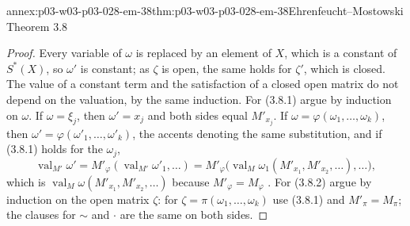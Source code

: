 \begin{annexitem}{annex:p03-w03-p03-028-em-38}{thm:p03-w03-p03-028-em-38}{Ehrenfeucht--Mostowski Theorem 3.8}
\begin{proof}
Every variable of \(\omega\) is replaced by an element of \(X\), which is a
constant of \(S^*(X)\), so \(\omega'\) is constant; as \(\zeta\) is open, the
same holds for \(\zeta'\), which is closed.  The value of a constant term and
the satisfaction of a closed open matrix do not depend on the valuation, by
the same induction.  For (3.8.1) argue by induction on \(\omega\).  If
\(\omega=\xi_j\), then \(\omega'=x_j\) and both sides equal \(M'_{x_j}\).  If
\(\omega=\varphi(\omega_1,\ldots,\omega_k)\), then
\(\omega'=\varphi(\omega'_1,\ldots,\omega'_k)\), the accents denoting the same
substitution, and if (3.8.1) holds for the \(\omega_j\),
\[
  \operatorname{val}_{M'}\omega'
  =M'_\varphi(\operatorname{val}_{M'}\omega'_1,\ldots)
  =M'_\varphi\bigl(\operatorname{val}_M\omega_1(M'_{x_1},M'_{x_2},\ldots),\ldots\bigr),
\]
which is \(\operatorname{val}_M\omega(M'_{x_1},M'_{x_2},\ldots)\) because
\(M'_\varphi=M_\varphi\) \cite[p.~55]{EhrenfeuchtMostowski1956}.  For (3.8.2)
argue by induction on the open matrix \(\zeta\): for
\(\zeta=\pi(\omega_1,\ldots,\omega_k)\) use (3.8.1) and \(M'_\pi=M_\pi\); the
clauses for \(\mathord\sim\) and \(\cdot\) are the same on both sides.
\end{proof}
\end{annexitem}

